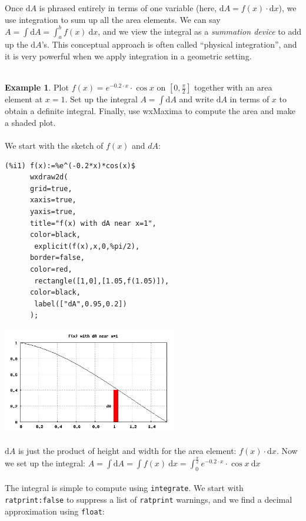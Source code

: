 \documentclass[10.5pt,twoside]{report}
\theoremstyle{definition}
\newtheorem{exmp}{Example}[section]
\begin{document}
Once  $\mathrm{d}A$ is phrased entirely in terms of one variable (here, $\mathrm{d}A=f(x)\cdot \mathrm{d}x$), we use integration to sum up all the area elements.  We can say $A=\displaystyle \int \mathrm{d}A = \displaystyle \int_{a}^{b} f(x) \ \mathrm{d}x$, and we view the integral as a \textit{summation device} to add up the $\mathrm{d}A$'s.  This conceptual approach is often called ``physical integration'', and it is very powerful when we apply integration in a geometric setting.\\
${}$\\

\begin{exmp}  Plot $f(x)=e^{-0.2\cdot x}\cdot \cos{x}$ on $[0,\frac{\pi}{2}]$ together with an area element at $x=1$.  Set up the integral $A= \displaystyle \int \mathrm{d}A$ and write $\mathrm{d} A$ in terms of $x$ to obtain a definite integral.  Finally, use wxMaxima to compute the area and make a shaded plot.\\
${}$\\

We start with the sketch of $f(x)$ and $dA$:

\begin{verbatim}
(%i1) f(x):=%e^(-0.2*x)*cos(x)$
      wxdraw2d(
      grid=true,
      xaxis=true,
      yaxis=true,
      title="f(x) with dA near x=1",
      color=black,
       explicit(f(x),x,0,%pi/2),
      border=false,
      color=red,
       rectangle([1,0],[1.05,f(1.05)]),
      color=black,
       label(["dA",0.95,0.2])
      );
\end{verbatim}

\includegraphics[width=3in]{example_7_3_1_1_1}
${}$\\
${}$\\
$\mathrm{d}A$ is just the product of height and width for the area element:  $f(x)\cdot \mathrm{d}x$.  Now we set up the integral:  $A = \displaystyle \int \mathrm{d}A = \displaystyle \int f(x)\ \mathrm{d}x = \displaystyle \int_0^{\frac{\pi}{2}} e^{-0.2\cdot x}\cdot \cos{x}\ \mathrm{d}x$\\
${}$\\
The integral is simple to compute using \verb|integrate|.  We start with \verb|ratprint:false| to suppress a list of \verb|ratprint| warnings, and we find a decimal approximation using \verb|float|:


\end{exmp}
\end{document}
